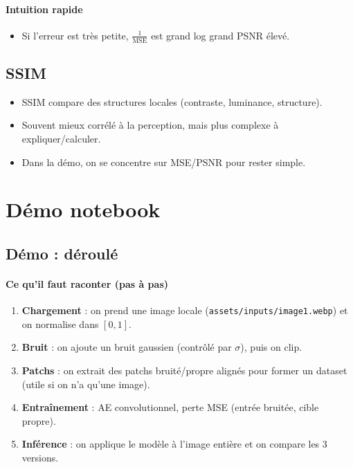 \documentclass[11pt,a4paper]{article}
\begin{document}
\paragraph{Intuition rapide}
\begin{itemize}
  \item Si l'erreur est très petite, $\frac{1}{\mathrm{MSE}}$ est grand \textrightarrow{} log grand \textrightarrow{} PSNR élevé.
\end{itemize}

\subsection{SSIM}
\begin{itemize}
  \item SSIM compare des structures locales (contraste, luminance, structure).
  \item Souvent mieux corrélé à la perception, mais plus complexe à expliquer/calculer.
  \item Dans la démo, on se concentre sur MSE/PSNR pour rester simple.
\end{itemize}

\section{Démo notebook}

\subsection{Démo : déroulé}
\paragraph{Ce qu'il faut raconter (pas à pas)}
\begin{enumerate}
  \item \textbf{Chargement} : on prend une image locale (\texttt{assets/inputs/image1.webp}) et on normalise dans $[0,1]$.
  \item \textbf{Bruit} : on ajoute un bruit gaussien (contrôlé par $\sigma$), puis on clip.
  \item \textbf{Patchs} : on extrait des patchs bruité/propre alignés pour former un dataset (utile si on n'a qu'une image).
  \item \textbf{Entraînement} : AE convolutionnel, perte MSE (entrée bruitée, cible propre).
  \item \textbf{Inférence} : on applique le modèle à l'image entière et on compare les 3 versions.
\end{enumerate}
\end{document}
